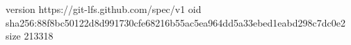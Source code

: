 version https://git-lfs.github.com/spec/v1
oid sha256:88f8bc50122d8d991730cfe68216b55ac5ea964dd5a33ebed1eabd298c7dc0e2
size 213318
